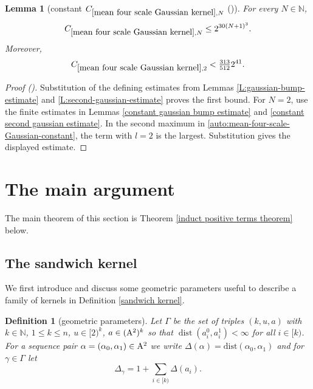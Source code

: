 \documentclass[12pt,reqno]{amsart}
\newcommand{\auto}{{({\tiny\faCar})}}
\theoremstyle{plain}
\newtheorem{lemma}[theorem]{Lemma}
\newtheorem{definition}[theorem]{Definition}
\numberwithin{equation}{section}
\theoremstyle{remark}
\newcommand{\using}[1]{}
\newcommand{\N}{{\mathbb N}}
\DeclareMathOperator{\dist}{dist}
\begin{document}
\begin{lemma}[constant $C_{\ref{mean four scale Gaussian kernel},N}$ \auto]\label{constant mean four scale Gaussian kernel}\using{L:gaussian-bump-estimate}\using{L:second-gaussian-estimate}\using{constant gaussian bump estimate}\using{constant second gaussian estimate}
For every $N\in\N$,
\begin{equation}\label{constant mean four scale Gaussian kernel bound}
C_{\ref{mean four scale Gaussian kernel},N}\le2^{30(N+1)^3}.
\end{equation}
Moreover,
\begin{equation}\label{auto:constant-mean-four-scale-Gaussian-kernel-two}
C_{\ref{mean four scale Gaussian kernel},2}<\tfrac{313}{512}2^{41}.
\end{equation}
\end{lemma}
\begin{proof}[Proof \auto]
Substitution of the defining estimates from Lemmas \ref{L:gaussian-bump-estimate} and \ref{L:second-gaussian-estimate} proves the first bound. For $N=2$, use the finite estimates in Lemmas \ref{constant gaussian bump estimate} and \ref{constant second gaussian estimate}. In the second maximum in \eqref{auto:mean-four-scale-Gaussian-constant}, the term with $l=2$ is the largest. Substitution gives the displayed estimate.
\end{proof}


\section{The main argument}\label{sec:main argument}

The main theorem of this section is Theorem \ref{induct positive terms theorem} below.

\subsection{The sandwich kernel}

We first introduce  and discuss some geometric parameters useful to describe a family of kernels in Definition \ref{sandwich kernel}.

\begin{definition}[geometric parameters]\label{geometric parameters}
  Let $\Gamma$ be the set of triples $(k,u,a)$ with $k\in\N$, $1\le k\le n$, $u\in[2)^k$, $a\in ({\rm A}^{2})^k$  so that $\dist(a_{i}^0,a_{i}^1)<\infty$ for all $i\in [k)$.
  For a sequence pair $\alpha=(\alpha_0,\alpha_1)\in {\rm A}^2$ we write $\Delta(\alpha) = \mathrm{dist}(\alpha_{0}, \alpha_1)$
  and for $\gamma\in\Gamma$ let
  \begin{equation}\label{auto:sandwich-distance-sum} \Delta_\gamma= 1+\sum_{i\in [k)} \Delta(a_i). \end{equation}
\end{definition}
\end{document}

